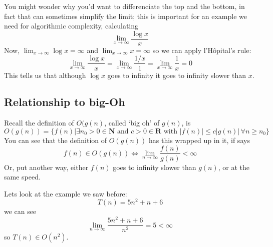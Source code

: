 \documentclass[11pt,a4paper]{scrartcl}
\begin{document}
You might wonder why you'd want to differenciate the top and the
bottom, in fact that can sometimes simplify the limit; this is
important for an example we need for algorithmic complexity, calculating
\begin{equation}
\lim_{x\rightarrow \infty}\frac{\log{x}}{x}
\end{equation}
Now, $\lim_{x\rightarrow\infty}\log{x}=\infty$ and $\lim_{x\rightarrow \infty}x=\infty$ so we can apply l'H\^{o}pital's rule:
\begin{equation}
\lim_{x\rightarrow \infty}\frac{\log{x}}{x}=\lim_{x\rightarrow \infty}\frac{1/x}{1}=\lim_{x\rightarrow \infty}\frac{1}{x}=0
\end{equation}
This tells us that although $\log{x}$ goes to infinity it goes to
infinity slower than $x$.

\subsection*{Relationship to big-Oh}

Recall the definition of $O(g(n)$, called \lq{}big oh\rq{} of
$g(n)$, is
\begin{equation}
O(g(n))=\{f(n)| \exists n_0>0\in \mathbf{ N}\mbox{ and }c>0\in \mathbf{R}\mbox{ with }|f(n)|\le c|g(n)|\,\forall n\ge n_0\}
\end{equation}
You can see that the definition of $O(g(n))$ has this wrapped up in
it, if says
\begin{equation}
f(n)\in O(g(n))\iff \lim_{n\rightarrow \infty}\frac{f(n)}{g(n)}<\infty
\end{equation}
Or, put another way, either $f(n)$ goes to infinity slower than
$g(n)$, or at the same speed.

Lets look at the example we saw before:
\begin{equation}
T(n)=5n^2+n+6
\end{equation}
we can see
\begin{equation}
\lim_{n\rightarrow \infty}\frac{5n^2+n+6}{n^2}=5<\infty
\end{equation}
so $T(n)\in O(n^2)$.
\end{document}
